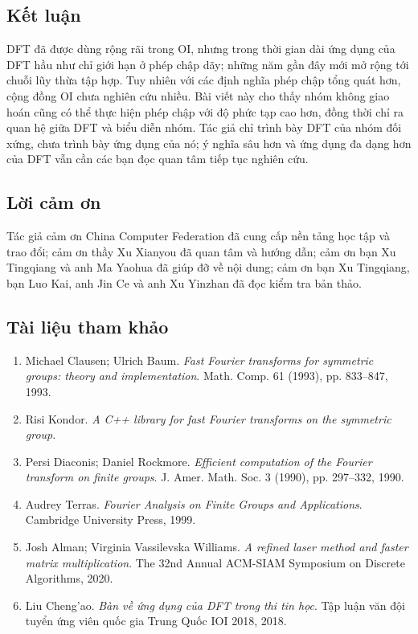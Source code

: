 \documentclass[11pt]{article}
\begin{document}
\subsection*{Kết luận}

DFT đã được dùng rộng rãi trong OI, nhưng trong thời gian dài ứng dụng của DFT
hầu như chỉ giới hạn ở phép chập dãy; những năm gần đây mới mở rộng tới chuỗi
lũy thừa tập hợp. Tuy nhiên với các định nghĩa phép chập tổng quát hơn, cộng
đồng OI chưa nghiên cứu nhiều. Bài viết này cho thấy nhóm không giao hoán cũng
có thể thực hiện phép chập với độ phức tạp cao hơn, đồng thời chỉ ra quan hệ
giữa DFT và biểu diễn nhóm. Tác giả chỉ trình bày DFT của nhóm đối xứng, chưa
trình bày ứng dụng của nó; ý nghĩa sâu hơn và ứng dụng đa dạng hơn của DFT vẫn
cần các bạn đọc quan tâm tiếp tục nghiên cứu.

\subsection*{Lời cảm ơn}

Tác giả cảm ơn China Computer Federation đã cung cấp nền tảng học tập và trao
đổi; cảm ơn thầy Xu Xianyou đã quan tâm và hướng dẫn; cảm ơn bạn Xu Tingqiang
và anh Ma Yaohua đã giúp đỡ về nội dung; cảm ơn bạn Xu Tingqiang, bạn Luo Kai,
anh Jin Ce và anh Xu Yinzhan đã đọc kiểm tra bản thảo.

\subsection*{Tài liệu tham khảo}

\begin{enumerate}
  \item Michael Clausen; Ulrich Baum. \emph{Fast Fourier transforms for
  symmetric groups: theory and implementation}. Math. Comp. 61 (1993),
  pp. 833--847, 1993.
  \item Risi Kondor. \emph{A C++ library for fast Fourier transforms on the
  symmetric group}.
  \item Persi Diaconis; Daniel Rockmore. \emph{Efficient computation of the
  Fourier transform on finite groups}. J. Amer. Math. Soc. 3 (1990),
  pp. 297--332, 1990.
  \item Audrey Terras. \emph{Fourier Analysis on Finite Groups and
  Applications}. Cambridge University Press, 1999.
  \item Josh Alman; Virginia Vassilevska Williams. \emph{A refined laser method
  and faster matrix multiplication}. The 32nd Annual ACM-SIAM Symposium on
  Discrete Algorithms, 2020.
  \item Liu Cheng'ao. \emph{Bàn về ứng dụng của DFT trong thi tin học}. Tập
  luận văn đội tuyển ứng viên quốc gia Trung Quốc IOI 2018, 2018.
\end{enumerate}
\end{document}
